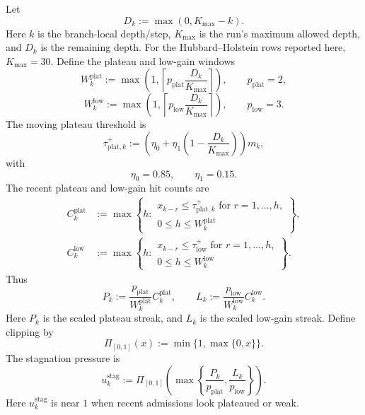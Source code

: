 \documentclass[
  reprint,
  amsmath,
  amssymb,
  aps,
  pra,
  nofootinbib,
  superscriptaddress,
  floatfix
]{revtex4-2}
\begin{document}
Let
\[
D_k:=\max(0,K_{\max}-k).
\]
Here \(k\) is the branch-local depth/step, \(K_{\max}\) is the run's maximum allowed depth, and \(D_k\) is the remaining depth.  For the Hubbard--Holstein rows reported here, \(K_{\max}=30\).  Define the plateau and low-gain windows
\[
W_k^{\mathrm{plat}}
:=
\max\!\left(
1,
\left\lceil
p_{\mathrm{plat}}\frac{D_k}{K_{\max}}
\right\rceil
\right),
\qquad
p_{\mathrm{plat}}=2,
\]
\[
W_k^{\mathrm{low}}
:=
\max\!\left(
1,
\left\lceil
p_{\mathrm{low}}\frac{D_k}{K_{\max}}
\right\rceil
\right),
\qquad
p_{\mathrm{low}}=3.
\]
The moving plateau threshold is
\[
\tau_{\mathrm{plat},k}^{+}
:=
\left(
\eta_0+\eta_1\left(1-\frac{D_k}{K_{\max}}\right)
\right)m_k,
\]
with
\[
\eta_0=0.85,
\qquad
\eta_1=0.15.
\]
The recent plateau and low-gain hit counts are
\[
\begin{aligned}
C_k^{\mathrm{plat}}
&:=
\max\left\{
h:
\begin{array}{l}
x_{k-r}\le \tau_{\mathrm{plat},k}^{+}
\text{ for } r=1,\ldots,h,
\\
0\le h\le W_k^{\mathrm{plat}}
\end{array}
\right\},
\\
C_k^{\mathrm{low}}
&:=
\max\left\{
h:
\begin{array}{l}
x_{k-r}\le \tau_{\mathrm{low}}^{+}
\text{ for } r=1,\ldots,h,
\\
0\le h\le W_k^{\mathrm{low}}
\end{array}
\right\}.
\end{aligned}
\]
Thus
\[
P_k:=
\frac{p_{\mathrm{plat}}}{W_k^{\mathrm{plat}}}
C_k^{\mathrm{plat}},
\qquad
L_k:=
\frac{p_{\mathrm{low}}}{W_k^{\mathrm{low}}}
C_k^{\mathrm{low}}.
\]
Here \(P_k\) is the scaled plateau streak, and \(L_k\) is the scaled low-gain streak.  Define clipping by
\[
\Pi_{[0,1]}(x):=\min\{1,\max\{0,x\}\}.
\]
The stagnation pressure is
\[
u_k^{\mathrm{stag}}
:=
\Pi_{[0,1]}
\left(
\max\left\{
\frac{P_k}{p_{\mathrm{plat}}},
\frac{L_k}{p_{\mathrm{low}}}
\right\}
\right).
\]
Here \(u_k^{\mathrm{stag}}\) is near \(1\) when recent admissions look plateaued or weak.
\end{document}
